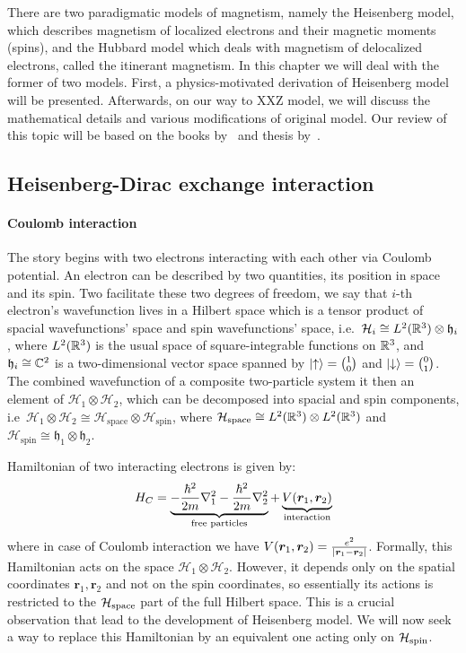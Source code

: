There are two paradigmatic models of magnetism, namely the Heisenberg model, which describes magnetism
of localized electrons and their magnetic moments (spins), and the Hubbard model which deals with
magnetism of delocalized electrons, called the itinerant magnetism. 
In this chapter we will deal with the former of two models.
First, a physics-motivated derivation of Heisenberg model will be presented. Afterwards,
on our way to XXZ model, we will discuss the mathematical details and various modifications
of original model. Our review of this topic will be based on the books by~\textcite{spalek2015} and 
thesis by~\textcite{Ng2011HeisenbergM}.

\subsection{Heisenberg-Dirac exchange interaction}
\paragraph{Coulomb interaction}The story begins with two electrons interacting with each other via Coulomb potential.
An electron can be described by two quantities, its position in space and its spin.
Two facilitate these two degrees of freedom, we say that \(i\)-th electron's wavefunction
lives in a Hilbert space which is a tensor product of spacial 
wavefunctions' space and spin wavefunctions' space, i.e.\ \(\mathcal{H}_i \cong L^2(\mathbb{R}^3)
\otimes \mathfrak{h}_i \), where \(L^2(\mathbb{R}^3)\) is the usual space of square-integrable functions on
\(\mathbb{R}^3\), and \(\mathfrak{h}_i \cong \mathbb{C}^2\) is a two-dimensional vector space spanned by
\(\ket{\uparrow} = \binom{1}{0} \) and \(\ket{\downarrow} = \binom{0}{1}\).
The combined wavefunction of a composite two-particle system it then an element of
\(\mathcal{H}_1 \otimes \mathcal{H}_2\), which can be decomposed into spacial and spin
components, i.e\ \(\mathcal{H}_1 \otimes \mathcal{H}_2 \cong\mathcal{H}_{\mathrm{space}} 
\otimes \mathcal{H}_{\mathrm{spin}}\), where \(\mathcal{H}_{\mathrm{space}} 
\cong L^2(\mathbb{R}^3) \otimes L^2(\mathbb{R}^3)\) and \(\mathcal{H}_{\mathrm{spin}} \cong
\mathfrak{h}_1 \otimes \mathfrak{h}_2\). 

Hamiltonian of two interacting electrons is given by:
\begin{equation}
    H_C = \underbrace{-\frac{\hbar^2}{2m} \laplacian_1  
    -\frac{\hbar^2}{2m} \laplacian_2 }_{\textrm{free particles}}
     + \underbrace{V(\bm{r}_1,\bm{r}_2)}_{\textrm{interaction}}
     \label{eq:Coulomb Hamiltonian}
\end{equation}
where in case of Coulomb interaction we have \(V(\bm{r}_1,\bm{r}_2)=\frac{e^2}
{\abs{\bm{r}_1-\bm{r}_2}}\).
Formally, this Hamiltonian acts on the space \(\mathcal{H}_1 \otimes \mathcal{H}_2\).
However, it depends only on the spatial coordinates \(\bm{r}_1,\bm{r}_2\) and not on
the spin coordinates, so essentially
its actions is restricted to the \(\mathcal{H}_{\textrm{space}}\) part of the full Hilbert space.
This is a crucial observation that lead to the development of Heisenberg model. We will now
seek a way to replace this Hamiltonian by an equivalent one acting only on 
\(\mathcal{H}_{\textrm{spin}}\).

